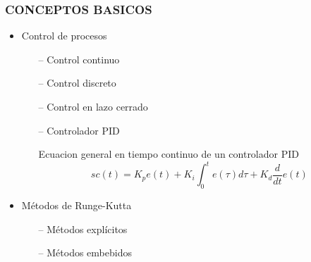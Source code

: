 \documentclass[usenames,xcolor={dvipsnames, table}]{beamer}
\begin{document}
\begin{frame}
	\frametitle{CONCEPTOS BASICOS}
	\vspace{20pt}

	\begin{itemize}
		\Large
		\setlength\itemsep{1em}
		\item Control de procesos
		\begin{itemize}
			\large
			\item[--] Control continuo
			\item[--] Control discreto
			\item[--] Control en lazo cerrado
			\item[--] Controlador PID
			\begin{block}{Ecuacion general en tiempo continuo de un controlador PID}
				\begin{equation}
					sc(t) = K_{p}e(t)+  K_{i}\int_{0}^{t} e(\tau) d\tau + K_{d} \frac{d}{dt}e(t)
				\end{equation}
			\end{block}
		\end{itemize}
		\item Métodos de Runge-Kutta
		\begin{itemize}
			\large
			\item[--] Métodos explícitos
			\item[--] Métodos embebidos
		\end{itemize} 
	\end{itemize}
	
\end{frame}
\end{document}
